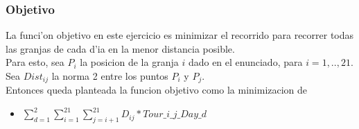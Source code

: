 \subsubsection{Objetivo}
La funci'on objetivo en este ejercicio es minimizar el recorrido para recorrer todas las granjas de cada d'ia en la menor distancia posible.\\
Para esto, sea $P_i$ la posicion de la granja $i$ dado en el enunciado, para $i = 1,..,21$. \\
Sea $Dist_{ij}$ la norma 2 entre los puntos $P_i$ y $P_j$. \\
Entonces queda planteada la funcion objetivo como la minimizacion de
\begin{itemize}
\item $ \sum_{d=1}^{2} \sum_{i=1}^{21} \sum_{j=i+1}^{21} D_{ij} * Tour\_i\_j\_Day\_d $
\end{itemize}
